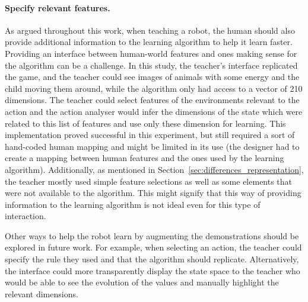 \paragraph{Specify relevant features.} 
As argued throughout this work, when teaching a robot, the human should also provide additional information to the learning algorithm to help it learn faster. Providing an interface between human-world features and ones making sense for the algorithm can be a challenge. 
In this study, the teacher's interface replicated the game, and the teacher could see images of animals with some energy and the child moving them around, while the algorithm only had access to a vector of 210 dimensions. The teacher could select features of the environments relevant to the action and the action analyser would infer the dimensions of the state which were related to this list of features and use only these dimension for learning. This implementation proved successful in this experiment, but still required a sort of hand-coded human mapping and might be limited in its use (the designer had to create a mapping between human features and the ones used by the learning algorithm). Additionally, as mentioned in Section~\ref{sec:differences_representation}, the teacher mostly used simple feature selections as well as some elements that were not available to the algorithm. This might signify that this way of providing information to the learning algorithm is not ideal even for this type of interaction.

Other ways to help the robot learn by augmenting the demonstrations should be explored in future work. For example, when selecting an action, the teacher could specify the rule they used and that the algorithm should replicate. Alternatively, the interface could more transparently display the state space to the teacher who would be able to see the evolution of the values and manually highlight the relevant dimensions.

